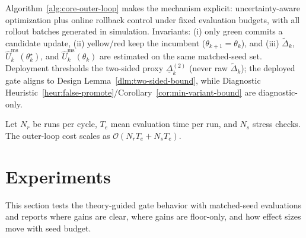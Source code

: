 \documentclass[letterpaper,10pt,conference]{ieeeconf}
\begin{document}
\begin{algorithm}[t]
\caption{CORE outer-loop policy optimization (deployed two-sided gate)}
\label{alg:core-outer-loop}
\end{algorithm}

Algorithm~\ref{alg:core-outer-loop} makes the mechanism explicit: uncertainty-aware optimization plus online rollback control under fixed evaluation budgets, with all rollout batches generated in simulation. Invariants: (i) only green commits a candidate update, (ii) yellow/red keep the incumbent ($\theta_{k+1}=\theta_k$), and (iii) $\tilde{\Delta}_k$, $\widehat{U}^{\mathrm{ms}}_k(\theta_k^\star)$, and $\widehat{U}^{\mathrm{ms}}_k(\theta_k)$ are estimated on the same matched-seed set. Deployment thresholds the two-sided proxy $\underline{\Delta}_k^{(2)}$ (never raw $\tilde{\Delta}_k$); the deployed gate aligns to Design Lemma~\ref{dlm:two-sided-bound}, while Diagnostic Heuristic~\ref{heur:false-promote}/Corollary~\ref{cor:min-variant-bound} are diagnostic-only.

Let $N_r$ be runs per cycle, $T_e$ mean evaluation time per run, and $N_s$ stress checks. The outer-loop cost scales as $\mathcal{O}(N_rT_e + N_sT_e)$.

\section{Experiments}
This section tests the theory-guided gate behavior with matched-seed evaluations and reports where gains are clear, where gains are floor-only, and how effect sizes move with seed budget.
\end{document}

